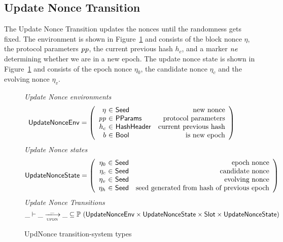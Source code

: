 \clearpage

\subsection{Update Nonce Transition}
\label{sec:update-nonces-trans}

The Update Nonce Transition updates the nonces until the randomness gets fixed.
The environment is shown in Figure~\ref{fig:ts-types:updnonce} and consists of
the block nonce $\eta$, the protocol parameters $\mathit{pp}$, the current previous hash $h_c$,
and a marker $\mathit{ne}$ determining whether we are in a new epoch.
The update nonce state is shown in Figure~\ref{fig:ts-types:updnonce} and consists of
the epoch nonce $\eta_0$, the candidate nonce $\eta_c$ and the evolving nonce $\eta_v$.

\begin{figure}
  \emph{Update Nonce environments}
  \begin{equation*}
    \UpdateNonceEnv =
    \left(
      \begin{array}{r@{~\in~}lr}
        \eta & \Seed & \text{new nonce} \\
        \var{pp} & \PParams & \text{protocol parameters} \\
        h_c & \HashHeader & \text{current previous hash} \\
        b & \Bool & \text{is new epoch} \\
      \end{array}
    \right)
  \end{equation*}
  \emph{Update Nonce states}
  \begin{equation*}
    \UpdateNonceState =
    \left(
      \begin{array}{r@{~\in~}lr}
        \eta_0 & \Seed & \text{epoch nonce} \\
        \eta_c & \Seed & \text{candidate nonce} \\
        \eta_v & \Seed & \text{evolving nonce} \\
        \eta_h & \Seed & \text{seed generated from hash of previous epoch} \\
      \end{array}
    \right)
  \end{equation*}
  \emph{Update Nonce Transitions}
  \begin{equation*}
    \_ \vdash \var{\_} \trans{updn}{\_} \var{\_} \subseteq
    \powerset (\UpdateNonceEnv
               \times \UpdateNonceState
               \times \Slot
               \times \UpdateNonceState
              )
  \end{equation*}
  \caption{UpdNonce transition-system types}
  \label{fig:ts-types:updnonce}
\end{figure}

